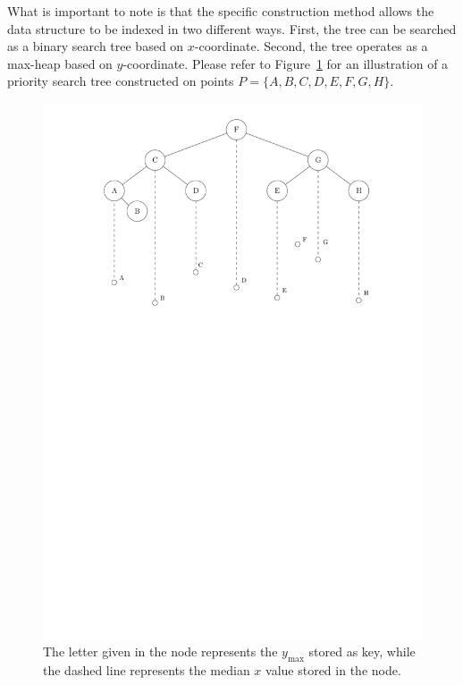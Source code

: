 \documentclass[twoside,11pt,openright]{report}
\begin{document}
What is important to note is that the specific construction method allows the data structure to be indexed in two different ways. First, the tree can be searched as a binary search tree based on $x$-coordinate. Second, the tree operates as a max-heap based on $y$-coordinate. Please refer to Figure~\ref{fig:static_pst} for an illustration of a priority search tree constructed on points $P = \{A, B, C, D, E, F, G, H\}$.

\begin{figure}[h]
	\centering
	\includegraphics[scale=0.68]{../figures/internal_pst_static}
	\caption{The letter given in the node represents the $y_{\text{max}}$ stored as key, while the dashed line represents the median $x$ value stored in the node.}
	\label{fig:static_pst}
\end{figure}
\end{document}
